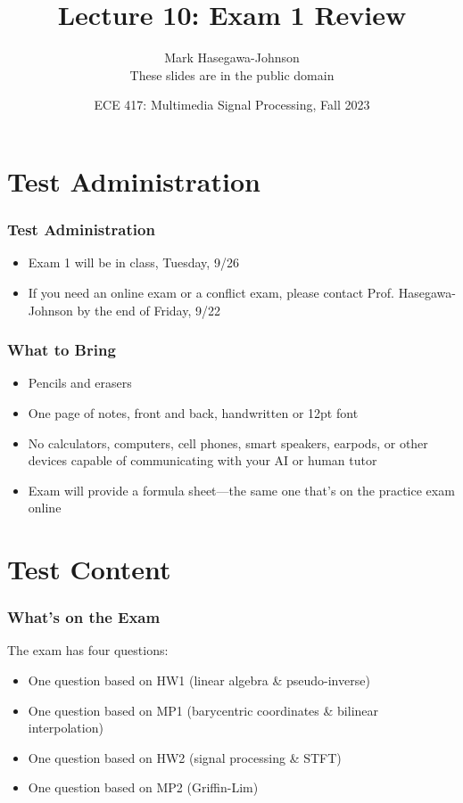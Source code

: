 \documentclass{beamer}
\title{Lecture 10: Exam 1 Review}
\author{Mark Hasegawa-Johnson\\These slides are in the public domain}
\date{ECE 417: Multimedia Signal Processing, Fall 2023}
\begin{document}
\begin{frame}
  \maketitle
\end{frame}

\begin{frame}
  \tableofcontents
\end{frame}


\section[Admin]{Test Administration}
\setcounter{subsection}{1}

\begin{frame}
  \frametitle{Test Administration}

  \begin{itemize}
  \item Exam 1 will be in class, Tuesday, 9/26
  \item If you need an online exam or a conflict exam, please contact
    Prof. Hasegawa-Johnson by the end of Friday, 9/22
  \end{itemize}
\end{frame}
  
\begin{frame}
  \frametitle{What to Bring}

  \begin{itemize}
  \item Pencils and erasers
  \item One page of notes, front and back, handwritten or 12pt font
  \item No calculators, computers, cell phones, smart speakers,
    earpods, or other devices capable of communicating with your AI
    or human tutor
  \item Exam will provide a formula sheet---the same one that's on the
    practice exam online
  \end{itemize}
\end{frame}
  
\section[Content]{Test Content}
\setcounter{subsection}{1}

\begin{frame}
  \frametitle{What's on the Exam}

  The exam has four questions:
  \begin{itemize}
  \item One question based on HW1 (linear algebra \& pseudo-inverse)
  \item One question based on MP1 (barycentric coordinates \& bilinear interpolation)
  \item One question based on HW2 (signal processing \& STFT)
  \item One question based on MP2 (Griffin-Lim)
  \end{itemize}
\end{frame}
\end{document}
